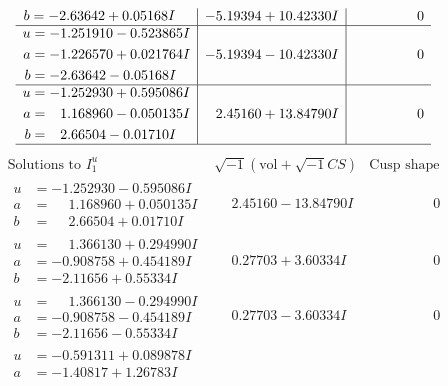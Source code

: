 \documentclass[1p]{elsarticle_modified}
\theoremstyle{definition}
\newcommand{\I}{\sqrt{-1}}
\begin{document}
$$\begin{array}{c|c|c}
\begin{aligned}
b &= -2.63642 + 0.05168 I\end{aligned}
 & -5.19394 + 10.42330 I & \phantom{-0.000000 } 0 \\ \hline\begin{aligned}
u &= -1.251910 - 0.523865 I \\
a &= -1.226570 + 0.021764 I \\
b &= -2.63642 - 0.05168 I\end{aligned}
 & -5.19394 - 10.42330 I & \phantom{-0.000000 } 0 \\ \hline\begin{aligned}
u &= -1.252930 + 0.595086 I \\
a &= \phantom{-}1.168960 - 0.050135 I \\
b &= \phantom{-}2.66504 - 0.01710 I\end{aligned}
 & \phantom{-}2.45160 + 13.84790 I & \phantom{-0.000000 } 0\\
 \hline 
 \end{array}$$\newpage$$\begin{array}{c|c|c}  
\text{Solutions to }I^u_{1}& \I (\text{vol} + \sqrt{-1}CS) & \text{Cusp shape}\\
 \hline 
\begin{aligned}
u &= -1.252930 - 0.595086 I \\
a &= \phantom{-}1.168960 + 0.050135 I \\
b &= \phantom{-}2.66504 + 0.01710 I\end{aligned}
 & \phantom{-}2.45160 - 13.84790 I & \phantom{-0.000000 } 0 \\ \hline\begin{aligned}
u &= \phantom{-}1.366130 + 0.294990 I \\
a &= -0.908758 + 0.454189 I \\
b &= -2.11656 + 0.55334 I\end{aligned}
 & \phantom{-}0.27703 + 3.60334 I & \phantom{-0.000000 } 0 \\ \hline\begin{aligned}
u &= \phantom{-}1.366130 - 0.294990 I \\
a &= -0.908758 - 0.454189 I \\
b &= -2.11656 - 0.55334 I\end{aligned}
 & \phantom{-}0.27703 - 3.60334 I & \phantom{-0.000000 } 0 \\ \hline\begin{aligned}
u &= -0.591311 + 0.089878 I \\
a &= -1.40817 + 1.26783 I \\

\end{aligned}
\end{array}$$
\end{document}

